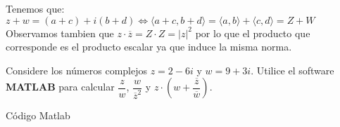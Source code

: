 \documentclass[twoside]{book}
\begin{document}
\begin{sol}
    \begin{solucion}{}
        Tenemos que:\\
        $z+w=(a+c)+i(b+d) \iff \langle a+c,b+d \rangle=\langle a,b \rangle+\langle c,d \rangle=Z+W$\\
        Observamos tambien que $z\cdot \overline{z}=Z\cdot Z=|z|^2$ por lo que el producto que corresponde es el producto escalar ya que induce la misma norma.

    \end{solucion}
\end{sol}

\begin{example}{}
    Considere los n\'umeros complejos $z=2-6i$ y $w=9+3i$. Utilice el software \textbf{MATLAB} para calcular $\dfrac{ z}{ w}$, $\dfrac{w}{ \overline{z}^2}$ y $z\cdot\left(w+\dfrac{ \overline{z}}{ \overline{w}}\right)$.
\end{example}
\begin{sol}
    \begin{solucion}{C\'odigo Matlab}
    \end{solucion}
\end{sol}
\end{document}
